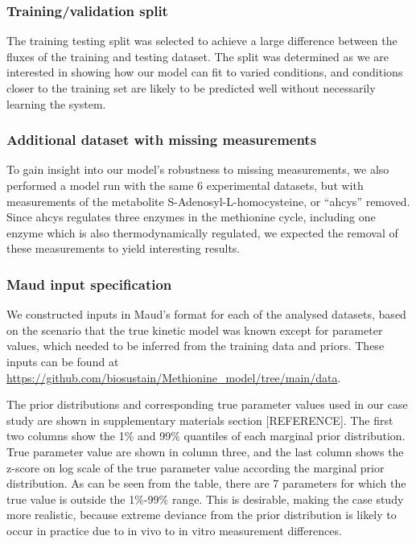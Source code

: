 \documentclass[journal=asbcd6,manuscript=article,layout=traditional]{achemso}
\begin{document}
\hypertarget{trainingvalidation-split}{%
\subsubsection{Training/validation
split}\label{trainingvalidation-split}}

The training testing split was selected to achieve a large difference
between the fluxes of the training and testing dataset. The split was
determined as we are interested in showing how our model can fit to
varied conditions, and conditions closer to the training set are likely
to be predicted well without necessarily learning the system.

\hypertarget{additional-dataset-with-missing-measurements}{%
\subsubsection{Additional dataset with missing
measurements}\label{additional-dataset-with-missing-measurements}}

To gain insight into our model's robustness to missing measurements, we
also performed a model run with the same 6 experimental datasets, but
with measurements of the metabolite S-Adenosyl-L-homocysteine, or
``ahcys'' removed. Since ahcys regulates three enzymes in the methionine
cycle, including one enzyme which is also thermodynamically regulated,
we expected the removal of these measurements to yield interesting
results.

\hypertarget{maud-input-specification}{%
\subsubsection{Maud input
specification}\label{maud-input-specification}}

We constructed inputs in Maud's format for each of the analysed
datasets, based on the scenario that the true kinetic model was known
except for parameter values, which needed to be inferred from the
training data and priors. These inputs can be found at
\url{https://github.com/biosustain/Methionine_model/tree/main/data}.

The prior distributions and corresponding true parameter values used in
our case study are shown in supplementary materials section
{[}REFERENCE{]}. The first two columns show the 1\% and 99\% quantiles
of each marginal prior distribution. True parameter value are shown in
column three, and the last column shows the z-score on log scale of the
true parameter value according the marginal prior distribution. As can
be seen from the table, there are 7 parameters for which the true value
is outside the 1\%-99\% range. This is desirable, making the case study
more realistic, because extreme deviance from the prior distribution is
likely to occur in practice due to in vivo to in vitro measurement
differences.
\end{document}
